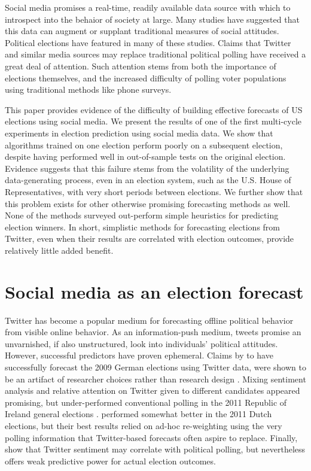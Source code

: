 \documentclass{sig-alternate-2013}
\begin{document}
Social media promises a real-time, readily available data source with
which to introspect into the behaior of society at large. Many
studies have suggested that this data can augment or supplant
traditional measures of social attitudes. Political elections
have featured in many of these studies. Claims that Twitter and
similar media sources may replace traditional political polling have
received a great deal of attention. Such attention stems from both the
importance of elections themselves, and the increased difficulty of
polling voter populations using traditional methods like phone surveys.

This paper provides evidence of the difficulty of building effective
forecasts of US elections using social media. We present the results
of one of the first multi-cycle experiments in election prediction
using social media data. We show that algorithms trained on one
election perform poorly on a subsequent election, despite having
performed well in out-of-sample tests on the original
election. Evidence suggests that this failure stems from the
volatility of the underlying data-generating process, even in an
election system, such as the U.S. House of Representatives, with very
short periods between elections. We further show that this problem
exists for other otherwise promising forecasting methods as well. None
of the methods surveyed out-perform simple heuristics for predicting
election winners. In short, simplistic methods for forecasting
elections from Twitter, even when their results are correlated with
election outcomes, provide relatively little added benefit.

\section{Social media as an election forecast}
\label{sec:social-media-as}

Twitter has become a popular medium for forecasting offline political
behavior from visible online behavior. As an information-push medium,
tweets promise an unvarnished, if also unstructured, look into
individuals' political attitudes. However, successful predictors have
proven ephemeral. Claims by \cite{tumasjan2010election} to have
successfully forecast the 2009 German elections using Twitter data,
were shown to be an artifact of researcher choices rather than
research design \cite{jungherr2012pirate}. Mixing sentiment analysis
and relative attention on Twitter given to different candidates appeared
promising, but under-performed conventional polling in the 2011
Republic of Ireland general elections
\cite{bermingham2011using}. \cite{sang2012predicting} performed
somewhat better in the 2011 Dutch elections, but their best results
relied on ad-hoc re-weighting using the very polling information that
Twitter-based forecasts often aspire to replace. Finally,
\cite{o2010tweets} show that Twitter sentiment may correlate with
political polling, but nevertheless offers weak predictive power for
actual election outcomes.
\end{document}
